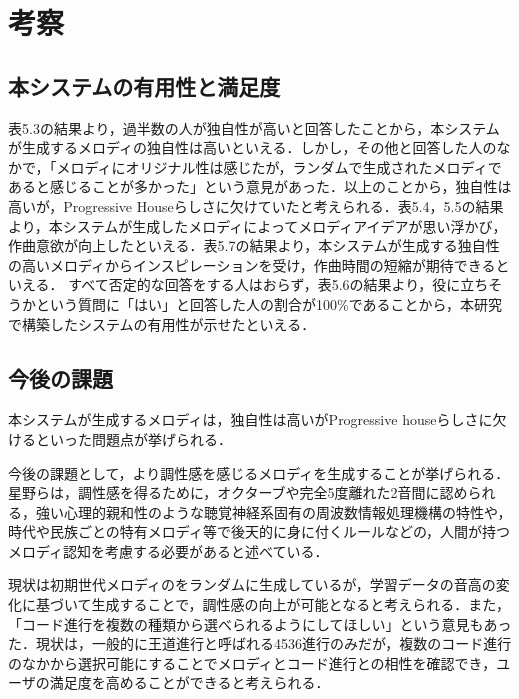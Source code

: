 \chapter{考察}
\section{本システムの有用性と満足度}
表5.3の結果より，過半数の人が独自性が高いと回答したことから，本システムが生成するメロディの独自性は高いといえる．しかし，その他と回答した人のなかで，「メロディにオリジナル性は感じたが，ランダムで生成されたメロディであると感じることが多かった」という意見があった．以上のことから，独自性は高いが，Progressive Houseらしさに欠けていたと考えられる．表5.4，5.5の結果より，本システムが生成したメロディによってメロディアイデアが思い浮かび，作曲意欲が向上したといえる．表5.7の結果より，本システムが生成する独自性の高いメロディからインスピレーションを受け，作曲時間の短縮が期待できるといえる．
すべて否定的な回答をする人はおらず，表5.6の結果より，役に立ちそうかという質問に「はい」と回答した人の割合が100\%であることから，本研究で構築したシステムの有用性が示せたといえる．
\section{今後の課題}
本システムが生成するメロディは，独自性は高いがProgressive houseらしさに欠けるといった問題点が挙げられる．

今後の課題として，より調性感を感じるメロディを生成することが挙げられる．星野らは，調性感を得るために，オクターブや完全5度離れた2音間に認められる，強い心理的親和性のような聴覚神経系固有の周波数情報処理機構の特性や，時代や民族ごとの特有メロディ等で後天的に身に付くルールなどの，人間が持つメロディ認知を考慮する必要があると述べている\cite{Hoshino84}．

現状は初期世代メロディのをランダムに生成しているが，学習データの音高の変化に基づいて生成することで，調性感の向上が可能となると考えられる．また，「コード進行を複数の種類から選べられるようにしてほしい」という意見もあった．現状は，一般的に王道進行と呼ばれる4536進行のみだが，複数のコード進行のなかから選択可能にすることでメロディとコード進行との相性を確認でき，ユーザの満足度を高めることができると考えられる．

